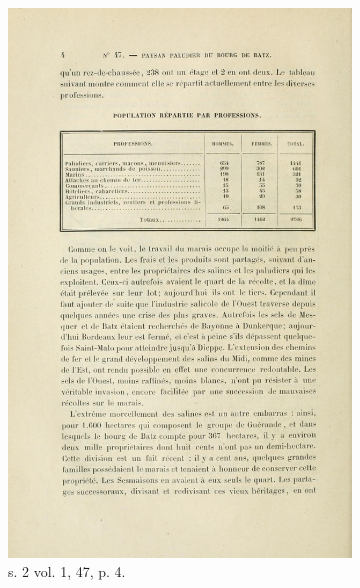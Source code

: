 \begin{figure}
    \centering
    \begin{subfigure}[t]{0.4\textwidth}
     \includegraphics[width=0.8\linewidth]{img/tabl_s2t1_m47_p4.png}
     \caption{s. 2 vol. 1, \no{} 47, p. 4.}
    \end{subfigure}
    \hspace{5pt}
    \begin{subfigure}[t]{0.4\textwidth}

\end{subfigure}
\end{figure}
